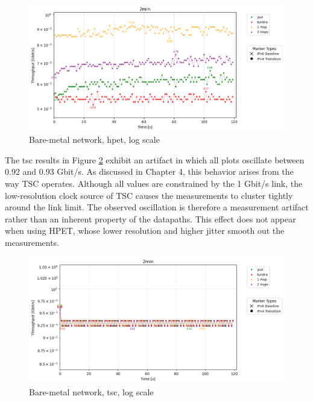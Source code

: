 \begin{figure}[H]
    \centering
    \includegraphics[width=1\textwidth]{resources/finalPlots/combinedplots/DoubleLocal_tcp_sameScale_hpet_2min_log.png}
    \caption{Bare-metal network, hpet, log scale}
    \label{fig:Dual_tcp_sameScale_hpet_log}
\end{figure}

The tsc results in Figure \ref{fig:Dual_tcp_sameScale_tsc_log} exhibit an artifact in which all plots oscillate between 0.92 and 0.93 Gbit/s. As discussed in Chapter 4, this behavior arises from the way TSC operates. Although all values are constrained by the 1 Gbit/s link, the low-resolution clock source of TSC causes the measurements to cluster tightly around the link limit. The observed oscillation is therefore a measurement artifact rather than an inherent property of the datapaths. This effect does not appear when using HPET, whose lower resolution and higher jitter smooth out the measurements.

\begin{figure}[H]
    \centering
    \includegraphics[width=1\textwidth]{resources/finalPlots/combinedplots/DoubleLocal_tcp_sameScale_tsc_2min_log.png}
    \caption{Bare-metal network, tsc, log scale}
    \label{fig:Dual_tcp_sameScale_tsc_log}
\end{figure}

